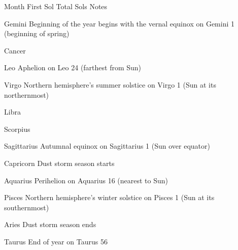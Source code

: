 {
    \bTABLE[split=repeat,option=stretch]
    \setupTABLE[column][4]
        [width=.60\textwidth,
        align=yes]
    \setupTABLE[row][each][align=center]
    \setupTABLE[4][1][align=center]

\bTABLEhead
    \bTR[bottomframe=on]
      \bTH  Month \eTH
      \bTH  First Sol \eTH
      \bTH  Total Sols \eTH
      \bTH  Notes \eTH
    \eTR
\eTABLEhead

\bTABLEbody
    \bTR
      \bTC Gemini \eTC
       \eTC
       \eTC
      \bTC Beginning of the year begins with the vernal equinox on Gemini 1 (beginning of spring)\eTC
    \eTR
    
    \bTR
      \bTC Cancer \eTC
       \eTC
       \eTC
      \bTC  \eTC
    \eTR
    
    \bTR
      \bTC Leo \eTC
       \eTC
       \eTC
      \bTC Aphelion on Leo 24 (farthest from Sun)\eTC
    \eTR
    
    \bTR
      \bTC Virgo \eTC
       \eTC
       \eTC
      \bTC Northern hemisphere's summer solstice on Virgo 1 (Sun at its northernmost)\eTC
    \eTR
    
    \bTR
      \bTC Libra \eTC
       \eTC
       \eTC
      \bTC  \eTC
    \eTR
    
    \bTR
      \bTC Scorpius \eTC
       \eTC
       \eTC
      \bTC  \eTC
    \eTR
    
    \bTR
      \bTC Sagittarius \eTC
       \eTC
       \eTC
      \bTC Autumnal equinox on Sagittarius 1 (Sun over equator)\eTC
    \eTR
    
    \bTR
      \bTC Capricorn \eTC
       \eTC
       \eTC
      \bTC Dust storm season starts \eTC
    \eTR
    
    \bTR
      \bTC Aquarius \eTC
       \eTC
       \eTC
      \bTC Perihelion on Aquarius 16 (nearest to Sun)\eTC
    \eTR
    
    \bTR
      \bTC Pisces \eTC
       \eTC
       \eTC
      \bTC Northern hemisphere's winter solstice on Pisces 1 (Sun at its southernmost) \eTC
    \eTR
    
    \bTR
      \bTC Aries \eTC
       \eTC
       \eTC
      \bTC Dust storm season ends \eTC
    \eTR 

    \bTR
      \bTC Taurus \eTC
       \eTC
       \eTC
      \bTC End of year on Taurus 56 \eTC
    \eTR 
\eTABLEbody

\eTABLE
}

